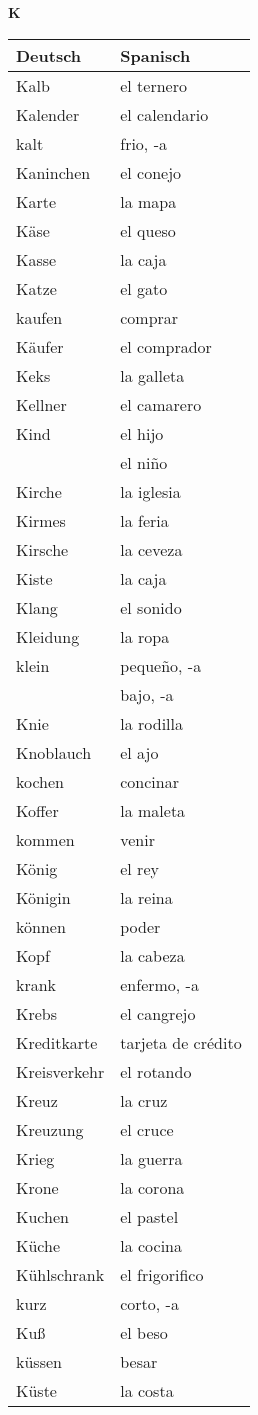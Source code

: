 \begin{flushright}\begin{Huge}\textbf{K}\end{Huge}\end{flushright}

\begin{longtable}{p{} p{}} 
\textbf{Deutsch}     & \textbf{Spanisch}                                       \\ \hline
\hline
\endhead %
Kalb & el ternero\\
Kalender & el calendario\\
kalt & frio, -a\\
Kaninchen & el conejo\\
Karte & la mapa\\
Käse & el queso\\
Kasse & la caja\\
Katze & el gato \\
kaufen & comprar\\
Käufer & el comprador\\
Keks & la galleta\\
Kellner & el camarero\\
Kind & el hijo\\
~ & el niño\\
Kirche & la iglesia\\
Kirmes & la feria\\
Kirsche & la ceveza\\
Kiste & la caja\\
Klang & el sonido\\
Kleidung & la ropa\\
klein & pequeño, -a\\
~ & bajo, -a\\
Knie & la rodilla\\
Knoblauch & el ajo\\
kochen & concinar\\
Koffer & la maleta\\
kommen & venir \\
König & el rey\\
Königin & la reina\\
können & poder\\
Kopf & la cabeza\\
krank & enfermo, -a\\
Krebs & el cangrejo\\
Kreditkarte & tarjeta de crédito\\
Kreisverkehr & el rotando\\
Kreuz & la cruz\\
Kreuzung & el cruce\\
Krieg & la guerra\\
Krone & la corona\\
Kuchen & el pastel\\
Küche & la cocina\\
Kühlschrank & el frigorifico\\
kurz & corto, -a\\
Kuß & el beso\\
küssen & besar\\
Küste & la costa\\
\end{longtable}
